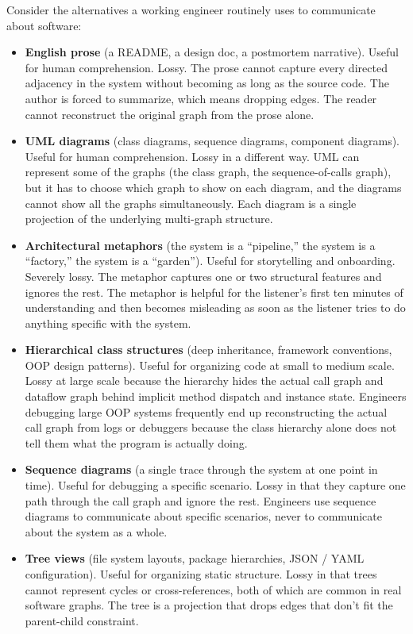 \documentclass[11pt]{article}
\begin{document}
Consider the alternatives a working engineer routinely uses to communicate about software:

\begin{itemize}[leftmargin=*]
\item \textbf{English prose} (a README, a design doc, a postmortem narrative). Useful for human comprehension. Lossy. The prose cannot capture every directed adjacency in the system without becoming as long as the source code. The author is forced to summarize, which means dropping edges. The reader cannot reconstruct the original graph from the prose alone.
\item \textbf{UML diagrams} (class diagrams, sequence diagrams, component diagrams). Useful for human comprehension. Lossy in a different way. UML can represent some of the graphs (the class graph, the sequence-of-calls graph), but it has to choose which graph to show on each diagram, and the diagrams cannot show all the graphs simultaneously. Each diagram is a single projection of the underlying multi-graph structure.
\item \textbf{Architectural metaphors} (the system is a ``pipeline,'' the system is a ``factory,'' the system is a ``garden''). Useful for storytelling and onboarding. Severely lossy. The metaphor captures one or two structural features and ignores the rest. The metaphor is helpful for the listener's first ten minutes of understanding and then becomes misleading as soon as the listener tries to do anything specific with the system.
\item \textbf{Hierarchical class structures} (deep inheritance, framework conventions, OOP design patterns). Useful for organizing code at small to medium scale. Lossy at large scale because the hierarchy hides the actual call graph and dataflow graph behind implicit method dispatch and instance state. Engineers debugging large OOP systems frequently end up reconstructing the actual call graph from logs or debuggers because the class hierarchy alone does not tell them what the program is actually doing.
\item \textbf{Sequence diagrams} (a single trace through the system at one point in time). Useful for debugging a specific scenario. Lossy in that they capture one path through the call graph and ignore the rest. Engineers use sequence diagrams to communicate about specific scenarios, never to communicate about the system as a whole.
\item \textbf{Tree views} (file system layouts, package hierarchies, JSON / YAML configuration). Useful for organizing static structure. Lossy in that trees cannot represent cycles or cross-references, both of which are common in real software graphs. The tree is a projection that drops edges that don't fit the parent-child constraint.
\end{itemize}
\end{document}
